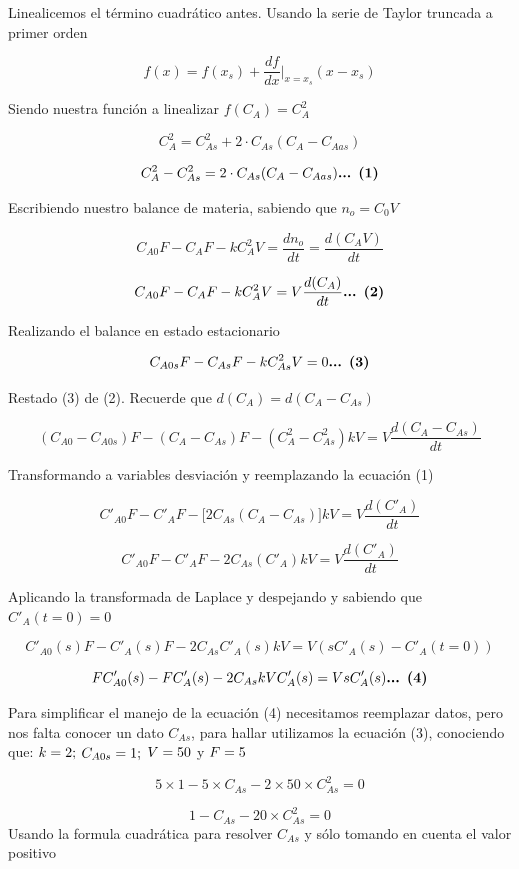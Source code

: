 \documentclass[
  letterpaper,
  DIV=11,
  numbers=noendperiod]{scrreprt}
\begin{document}
Linealicemos el término cuadrático antes. Usando la serie de Taylor
truncada a primer orden

\[
f(x)=f(x_s)+\frac{df}{dx}\bigg |_{x=x_s} (x-x_s)
\]

Siendo nuestra función a linealizar \(f(C_{A})=C_A^2\)

\[
C_A^2=C_{As}^2+2\cdot C_{As}(C_A-C_{Aas})
\]

\[
C_A^2-C_{As}^2=2\cdot C_{As}(C_A-C_{Aas})\space\space\space\space\space\textbf{... (1)}
\]

Escribiendo nuestro balance de materia, sabiendo que \(n_o = C_0V\)

\[
C_{A0}F-C_AF-kC_A^2V=\frac{dn_o}{dt} = \frac{d(C_AV)}{dt}
\]

\[
C_{A0}F-C_AF-kC_A^2V=V \frac{d(C_A)}{dt} \space\space\space\space\space\textbf{... (2)}
\]

Realizando el balance en estado estacionario

\[
C_{A0s}F-C_{As}F-kC_{As}^2V=0 \space\space\space\space\space\textbf{... (3)}
\]

Restado (3) de (2). Recuerde que \(d(C_A)=d(C_A-C_{As})\)

\[
(C_{A0}-C_{A0s})F-(C_A-C_{As})F-(C_A^2-C_{As}^2)kV=V \frac{d(C_A-C_{As})}{dt}
\]

Transformando a variables desviación y reemplazando la ecuación (1)

\[
C'_{A0}F-C'_AF-\big[2C_{As}(C_A-C_{As})\big]kV=V \frac{d(C'_A)}{dt}
\]

\[
C'_{A0}F-C'_AF-2C_{As}(C'_A)kV=V \frac{d(C'_A)}{dt}
\]

Aplicando la transformada de Laplace y despejando y sabiendo que
\(C'_A(t=0) = 0\)

\[
C'_{A0}(s)F-C'_A(s)F-2C_{As}C'_A(s)kV=V (sC'_A(s)-C'_A(t=0))
\]

\[
FC'_{A0}(s)-FC'_A(s)-2C_{As}kVC'_A(s)=V sC'_A(s)\space\space\space\space\space\textbf{... (4)}
\]

Para simplificar el manejo de la ecuación (4) necesitamos reemplazar
datos, pero nos falta conocer un dato \(C_{As}\), para hallar utilizamos
la ecuación (3), conociendo que: \(k = 2;\space\space\)
\(C_{A0s} = 1;\space\space\) \(V=50\space\space\) y \(\space F= 5\)

\[
5\times 1-5\times C_{As}-2\times 50\times C_{As}^2=0
\]

\[
1-C_{As}-20\times C_{As}^2=0
\] Usando la formula cuadrática para resolver \(C_{As}\) y sólo tomando
en cuenta el valor positivo
\end{document}
